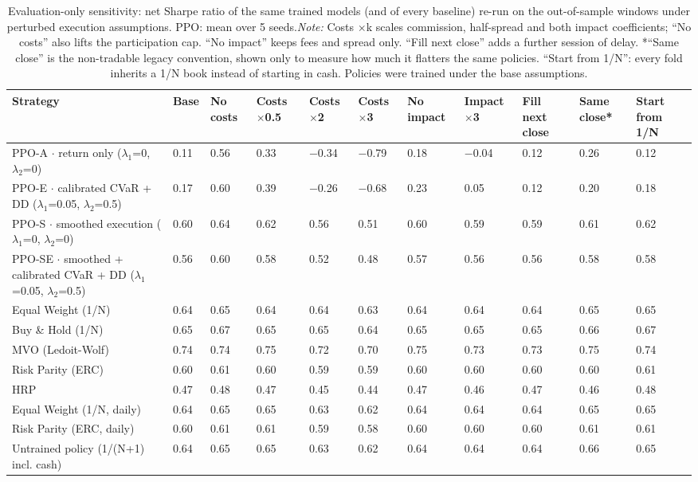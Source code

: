 \documentclass[11pt]{article}
\begin{document}
\begin{table}[!htbp]
\centering\scriptsize
\caption{Evaluation-only sensitivity: net Sharpe ratio of the same trained models (and of every baseline) re-run on the out-of-sample windows under perturbed execution assumptions. PPO: mean over 5 seeds.\label{tab-sens-no} \emph{Note:} Costs $\times$k scales commission, half-spread and both impact coefficients; ``No costs'' also lifts the participation cap. ``No impact'' keeps fees and spread only. ``Fill next close'' adds a further session of delay. *``Same close'' is the non-tradable legacy convention, shown only to measure how much it flatters the same policies. ``Start from 1/N'': every fold inherits a 1/N book instead of starting in cash. Policies were trained under the base assumptions.}
\begin{adjustbox}{max width=\linewidth}
\begin{tabular}{@{}lllllllllll@{}}
\toprule
Strategy & Base & No costs & Costs $\times$0.5 & Costs $\times$2 & Costs $\times$3 & No impact & Impact $\times$3 & Fill next close & Same close* & Start from 1/N \\
\midrule
PPO-A $\cdot$ return only {($\lambda_1$=0, $\lambda_2$=0)} & 0.11 & 0.56 & 0.33 & $-$0.34 & $-$0.79 & 0.18 & $-$0.04 & 0.12 & 0.26 & 0.12 \\
PPO-E $\cdot$ calibrated CVaR + DD {($\lambda_1$=0.05, $\lambda_2$=0.5)} & 0.17 & 0.60 & 0.39 & $-$0.26 & $-$0.68 & 0.23 & 0.05 & 0.12 & 0.20 & 0.18 \\
PPO-S $\cdot$ smoothed execution {($\lambda_1$=0, $\lambda_2$=0)} & 0.60 & 0.64 & 0.62 & 0.56 & 0.51 & 0.60 & 0.59 & 0.59 & 0.61 & 0.62 \\
PPO-SE $\cdot$ smoothed + calibrated CVaR + DD {($\lambda_1$=0.05, $\lambda_2$=0.5)} & 0.56 & 0.60 & 0.58 & 0.52 & 0.48 & 0.57 & 0.56 & 0.56 & 0.58 & 0.58 \\
Equal Weight (1/N) & 0.64 & 0.65 & 0.64 & 0.64 & 0.63 & 0.64 & 0.64 & 0.64 & 0.65 & 0.65 \\
Buy \& Hold (1/N) & 0.65 & 0.67 & 0.65 & 0.65 & 0.64 & 0.65 & 0.65 & 0.65 & 0.66 & 0.67 \\
MVO (Ledoit-Wolf) & 0.74 & 0.74 & 0.75 & 0.72 & 0.70 & 0.75 & 0.73 & 0.73 & 0.75 & 0.74 \\
Risk Parity (ERC) & 0.60 & 0.61 & 0.60 & 0.59 & 0.59 & 0.60 & 0.60 & 0.60 & 0.60 & 0.61 \\
HRP & 0.47 & 0.48 & 0.47 & 0.45 & 0.44 & 0.47 & 0.46 & 0.47 & 0.46 & 0.48 \\
Equal Weight (1/N, daily) & 0.64 & 0.65 & 0.65 & 0.63 & 0.62 & 0.64 & 0.64 & 0.64 & 0.65 & 0.65 \\
Risk Parity (ERC, daily) & 0.60 & 0.61 & 0.61 & 0.59 & 0.58 & 0.60 & 0.60 & 0.60 & 0.61 & 0.61 \\
Untrained policy (1/(N+1) incl. cash) & 0.64 & 0.65 & 0.65 & 0.63 & 0.62 & 0.64 & 0.64 & 0.64 & 0.66 & 0.65 \\
\bottomrule
\end{tabular}
\end{adjustbox}
\end{table}
\end{document}
